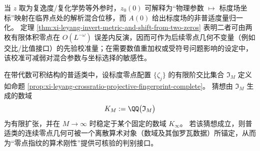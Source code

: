 \begin{remark}[混合位移与度量归一化的可观测反演接口]\label{rem:xi-leyang-twozero-calibration-interface}
当 \(z\) 取为复逸度/复化学势等外参时，\(z_0(0)\) 可解释为“物理参数 \(\mapsto\) 标度场坐标”映射在临界点处的解析混合位移，而 \(A(0)\) 给出标度场的非普适度量归一化。
定理 \ref{thm:xi-leyang-invert-metric-and-shift-from-two-zeros} 表明二者可由两枚有限体积零点在 \(O(L^{-\omega})\) 误差内反演，因而可作为后续零点几何不变量（例如交比/比值接口）的先验校准量；在需要数值重加权或受符号问题影响的设定中，该校准可减弱对混合参数与坐标选择的敏感性。
\end{remark}





\begin{conjecture}[交比常数的数域有限生成与稳定性]\label{conj:xi-leyang-crossratio-arithmetic-rigidity}
在带代数可积结构的普适类中，设标度零点配置 \(\{\zeta_j\}\) 的有限阶交比集合 \(\mathfrak{I}_M\) 定义如命题 \ref{prop:xi-leyang-crossratio-projective-fingerprint-complete}。
猜想由 \(\mathfrak{I}_M\) 生成的数域
\[
K_M:=\QQ\bigl(\mathfrak{I}_M\bigr)
\]
为有限扩张，并在 \(M\to\infty\) 时稳定于某个固定的数域 \(K_\infty\)。
若该猜想成立，则普适类的连续零点几何可被一个离散算术对象（数域及其伽罗瓦数据）所锚定，从而为“零点指纹的算术刚性”提供可核验的判别接口。
\end{conjecture}
